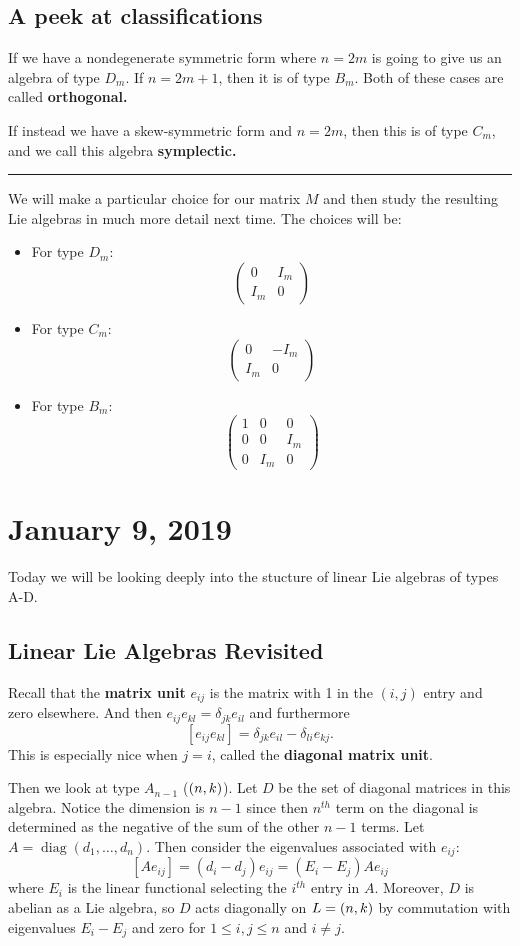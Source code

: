 \documentclass[12pt]{article}
\theoremstyle{nonumberbreak}
\theoremstyle{changebreak}
\theoremstyle{nonumberbreak}
\theoremstyle{change}
\newcommand*{\brk}{
\rule{2in}{.1pt}
}
\let\sl\relax
\DeclareMathOperator{\sl}{\mathfrak{sl}}
\begin{document}
\subsection{A peek at classifications}
If we have a nondegenerate symmetric form where $n=2m$ is going to give us an algebra
of type $D_m$. If $n=2m+1$, then it is of type $B_m$. Both of these cases are called
\textbf{orthogonal.}

If instead we have a skew-symmetric form and $n=2m$, then this is of type $C_m$, and we 
call this algebra \textbf{symplectic.}

\brk

We will make a particular choice for our matrix $M$ and then study the resulting
Lie algebras in much more detail next time. The choices will be: 
\begin{itemize}
	\item For type $D_m$:
	\[\begin{pmatrix}
		0 & I_m\\
		I_m & 0
	\end{pmatrix}\]
	\item For type $C_m$:
	\[\begin{pmatrix}
		0 & -I_m\\
		I_m & 0
	\end{pmatrix}\]
	\item For type $B_m$:
	\[\begin{pmatrix}
		1 & 0 & 0\\
		0 & 0 & I_m\\
		0 & I_m & 0
	\end{pmatrix}\]
\end{itemize}

\section{January 9, 2019}
Today we will be looking deeply into the stucture of linear Lie algebras of types A-D.

\subsection{Linear Lie Algebras Revisited}
Recall that the \textbf{matrix unit} $e_{ij}$ is the matrix with 1 in the $(i,j)$ entry and 
zero elsewhere. And then $e_{ij}e_{kl}=\delta_{jk}e_{il}$ and furthermore
\[[e_{ij}e_{kl}]=\delta_{jk}e_{il}-\delta_{li}e_{kj}.\]
This is especially nice when $j=i$, called the \textbf{diagonal matrix unit}.

Then we look at type $A_{n-1}$ ($\sl(n,k)$). Let $D$ be the set of diagonal matrices in this algebra.
Notice the dimension is $n-1$ since then $n^{th}$ term on the diagonal is determined as the
negative of the sum of the other $n-1$ terms. Let $A=\operatorname{diag}(d_1,\dots,d_n)$. Then consider the eigenvalues
associated with $e_{ij}$: 
\[[Ae_{ij}]=(d_i-d_j)e_{ij}=(E_i-E_j)Ae_{ij}\]
where $E_i$ is the linear functional selecting the $i^{th}$ entry in $A$. Moreover, $D$ is abelian as a Lie algebra, so $D$
acts diagonally on $L=\sl(n,k)$ by commutation with eigenvalues $E_i-E_j$ and zero
for $1\le i,j\le n$ and $i\ne j$.
\end{document}
